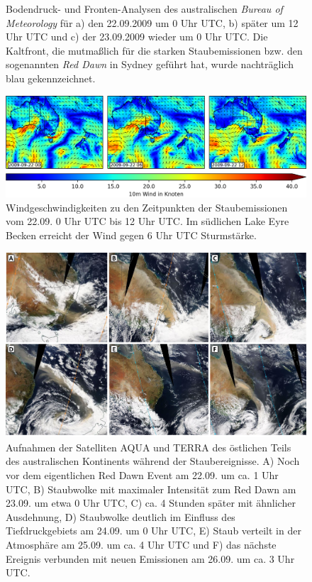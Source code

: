 \documentclass[12pt,a4paper,onecolumn,headheight=30pt]{scrartcl}
\begin{document}
\begin{figure}[htbp]
\begin{minipage}[c]{0.33\textwidth}
	\end{minipage}\hfill
	\caption{Bodendruck- und Fronten-Analysen des australischen \textit{Bureau of Meteorology} für a) den 22.09.2009 um 0 Uhr UTC, b) später um 12 Uhr UTC und c) der 23.09.2009 wieder um 0 Uhr UTC. Die Kaltfront, die mutmaßlich für die starken Staubemissionen bzw. den sogenannten \textit{Red Dawn} in Sydney geführt hat, wurde nachträglich blau gekennzeichnet.} \label{fig:bom_analysis}
\end{figure}
\begin{figure}[htbp]
\includegraphics[width=\textwidth]{bilder/reddawn/wind_reddawn_small.png}
\caption{Windgeschwindigkeiten zu den Zeitpunkten der Staubemissionen vom 22.09. 0 Uhr UTC bis 12 Uhr UTC. Im südlichen Lake Eyre Becken erreicht der Wind gegen 6 Uhr UTC Sturmstärke.} \label{fig:wind_reddawn}
\end{figure}
\begin{figure}[htbp]
\includegraphics[width=\textwidth]{bilder/reddawn/reddawn_satellite.pdf}
\caption{Aufnahmen der Satelliten AQUA und TERRA des östlichen Teils des australischen Kontinents während der Staubereignisse. A) Noch vor dem eigentlichen Red Dawn Event am 22.09. um ca. 1 Uhr UTC, B) Staubwolke mit maximaler Intensität zum Red Dawn am 23.09. um etwa 0 Uhr UTC, C) ca. 4 Stunden später mit ähnlicher Ausdehnung, D) Staubwolke deutlich im Einfluss des Tiefdruckgebiets am 24.09. um 0 Uhr UTC, E) Staub verteilt in der Atmosphäre am 25.09. um ca. 4 Uhr UTC und F) das nächste Ereignis verbunden mit neuen Emissionen am 26.09. um ca. 3 Uhr UTC.} \label{fig:satellite}
\end{figure}
\end{document}
